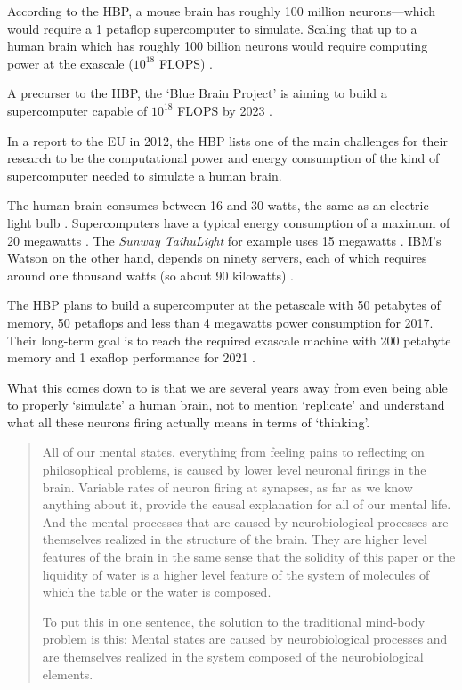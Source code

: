 According to the \ac{HBP}, a mouse brain has roughly 100 million neurons---which would require a 1 petaflop supercomputer to simulate. Scaling that up to a human brain which has roughly 100 billion neurons would require computing power at the exascale ($10^{18}$ \ac{FLOPS}) \autocite{Walker2012}.

A precurser to the \ac{HBP}, the `Blue Brain Project' is aiming to build a supercomputer capable of $10^{18}$ \ac{FLOPS} by 2023 \autocite{Kurzweil2013}.

In a report to the \ac{EU} in 2012, the \ac{HBP} lists one of the main challenges for their research to be the computational power and energy consumption of the kind of supercomputer needed to simulate a human brain.

The human brain consumes between 16 and 30 watts, the same as an electric light bulb \autocite{Walker2012,Jabr2012}. Supercomputers have a typical energy consumption of a maximum of 20 megawatts \autocite{Walker2012}. The \textit{Sunway TaihuLight} for example uses 15 megawatts \autocite{Fu2016}. IBM's Watson on the other hand, depends on ninety servers, each of which requires around one thousand watts (so about 90 kilowatts) \autocite{Jabr2012}.

The \ac{HBP} plans to build a supercomputer at the petascale with 50 petabytes of memory, 50 petaflops and less than 4 megawatts power consumption for 2017. Their long-term goal is to reach the required exascale machine with 200 petabyte memory and 1 exaflop performance for 2021 \autocite{Walker2012}.


What this comes down to is that we are several years away from even being able to properly `simulate' a human brain, not to mention `replicate' and understand what all these neurons firing actually means in terms of `thinking'. 

\begin{quotation}
  All of our mental states, everything from feeling pains to reflecting on philosophical problems, is caused by lower level neuronal firings in the brain. Variable rates of neuron firing at synapses, as far as we know anything about it, provide the causal explanation for all of our mental life. And the mental processes that are caused by neurobiological processes are themselves realized in the structure of the brain. They are higher level features of the brain in the same sense that the solidity of this paper or the liquidity of water is a higher level feature of the system of molecules of which the table or the water is composed.

  To put this in one sentence, the solution to the traditional mind-body problem is this: Mental states are caused by neurobiological processes and are themselves realized in the system composed of the neurobiological elements.
\end{quotation}

